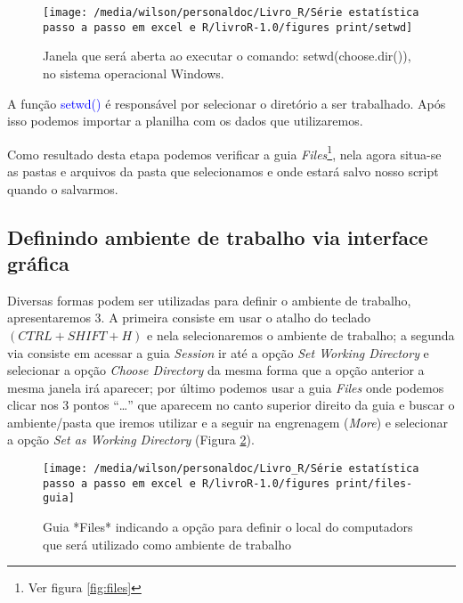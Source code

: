 \documentclass[14pt,titlepage, oneside, openany, a4paper]{book}
\begin{document}
\begin{figure}[H]

{\centering \texttt{[image: /media/wilson/personaldoc/Livro\_R/Série estatística passo a passo em excel e R/livroR-1.0/figures print/setwd]} 

}

\caption{Janela que será aberta ao executar o comando: setwd(choose.dir()), no sistema operacional Windows.}\label{fig:setwd}
\end{figure}

A função \textcolor{blue}{setwd()} é responsável por selecionar o diretório a ser trabalhado. Após isso podemos importar a planilha com os dados que utilizaremos.

Como resultado desta etapa podemos verificar a guia \emph{Files}\footnote{Ver figura \ref{fig:files}}, nela agora situa-se as pastas e arquivos da pasta que selecionamos e onde estará salvo nosso script quando o salvarmos.

\hypertarget{definindo-ambiente-de-trabalho-via-interface-gruxe1fica}{%
\subsection{Definindo ambiente de trabalho via interface gráfica}\label{definindo-ambiente-de-trabalho-via-interface-gruxe1fica}}

Diversas formas podem ser utilizadas para definir o ambiente de trabalho, apresentaremos 3. A primeira consiste em usar o atalho do teclado \((CTRL + SHIFT + H)\) e nela selecionaremos o ambiente de trabalho; a segunda via consiste em acessar a guia \emph{Session} ir até a opção \emph{Set Working Directory} e selecionar a opção \emph{Choose Directory} da mesma forma que a opção anterior a mesma janela irá aparecer; por último podemos usar a guia \emph{Files} onde podemos clicar nos 3 pontos ``\ldots{}'' que aparecem no canto superior direito da guia e buscar o ambiente/pasta que iremos utilizar e a seguir na engrenagem (\emph{More}) e selecionar a opção \emph{Set as Working Directory} (Figura \ref{fig:files-guia}).

\begin{figure}[H]

{\centering \texttt{[image: /media/wilson/personaldoc/Livro\_R/Série estatística passo a passo em excel e R/livroR-1.0/figures print/files-guia]} 

}

\caption{Guia *Files* indicando a opção para definir o local do computadors que será utilizado como ambiente de trabalho}\label{fig:files-guia}
\end{figure}
\end{document}
